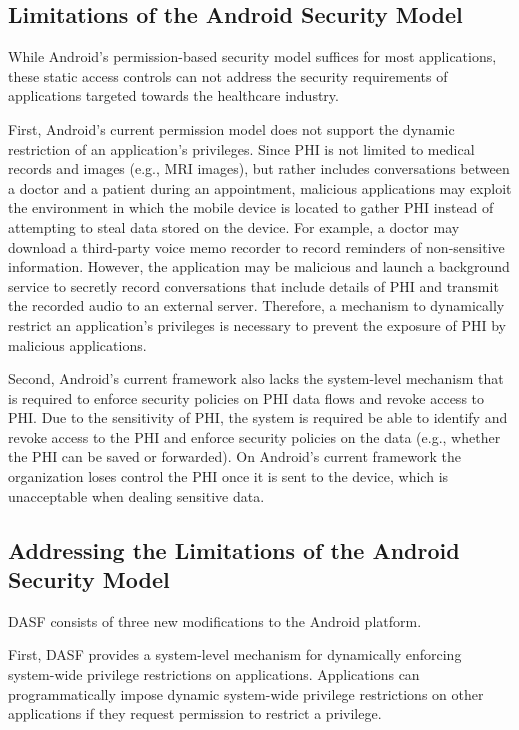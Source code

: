 \subsection{Limitations of the Android Security Model}

While Android's permission-based security model suffices for
most applications, these static access controls can not address
the security requirements of applications targeted towards
the healthcare industry.

First, Android's current permission model does not support the
dynamic restriction of an application's privileges.  Since PHI
is not limited to medical records and images (e.g., MRI images),
but rather includes conversations between a doctor and a patient
during an appointment, malicious applications may exploit the
environment in which the mobile device is located to gather PHI
instead of attempting to steal data stored on the device.  For
example, a doctor may download a third-party voice memo recorder
to record reminders of non-sensitive information.  However, the
application may be malicious and launch a background service to
secretly record conversations that include details of PHI and
transmit the recorded audio to an external server.  Therefore,
a mechanism to dynamically restrict an application's privileges
is necessary to prevent the exposure of PHI by malicious
applications.

Second, Android's current framework also lacks the
system-level mechanism that is required to enforce security
policies on PHI data flows and revoke access to PHI.  Due to
the sensitivity of PHI, the system is required be able to
identify and revoke access to the PHI and enforce security policies
on the data (e.g., whether the PHI can be saved or forwarded).
On Android's current framework the organization loses
control the PHI once it is sent to the device, which is
unacceptable when dealing sensitive data.

\subsection{Addressing the Limitations of the Android Security Model}

DASF consists of three new
modifications to the Android platform. 

First, DASF provides a system-level mechanism for dynamically
enforcing system-wide privilege restrictions on applications.
Applications can programmatically impose dynamic system-wide privilege
restrictions on other applications if they request permission to
restrict a privilege.

